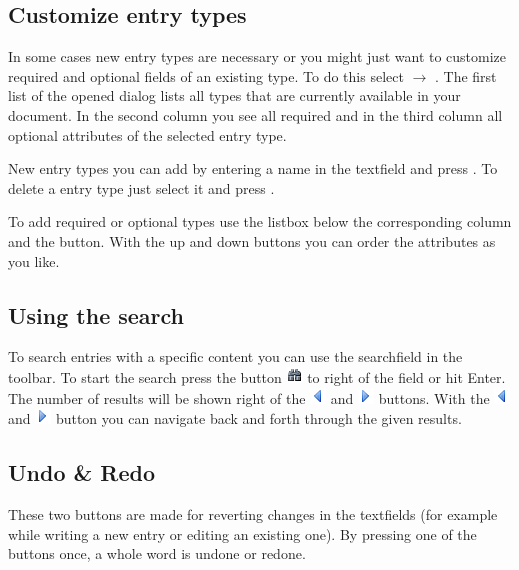 \documentclass[a4paper,10pt]{scrartcl}
\begin{document}
\subsection{Customize entry types}
In some cases new entry types are necessary or you might just want to customize
required and optional fields of an existing type. To do this select \edit
$\rightarrow$ \customizeentrytyp. The first list of the opened dialog lists all
types that are currently available in your document. In the second column you
see all required and in the third column all optional attributes of the selected
entry type.

New entry types you can add by entering a name in the textfield and press \add.
To delete a entry type just select it and press \remove.

To add required or optional types use the listbox below the corresponding
column and the \add button. With the up and down buttons you can order the
attributes as you like.
\subsection{Using the search}
To search entries with a specific content you can use the searchfield in the
toolbar. To start the search press the button
\includegraphics{../../images/find.png} to right of the field or hit Enter.
The number of results will be shown right of the
\includegraphics{../../images/resultset_previous.png} and
\includegraphics{../../images/resultset_next.png} buttons. With the
\includegraphics{../../images/resultset_previous.png} and
\includegraphics{../../images/resultset_next.png} button you can navigate back
and forth through the given results.
\subsection{Undo \& Redo}
\label{undoredo}
These two buttons are made for reverting changes in the textfields (for example
while writing a new entry or editing an existing one). By pressing one of the
buttons once, a whole word is undone or redone.
\end{document}
